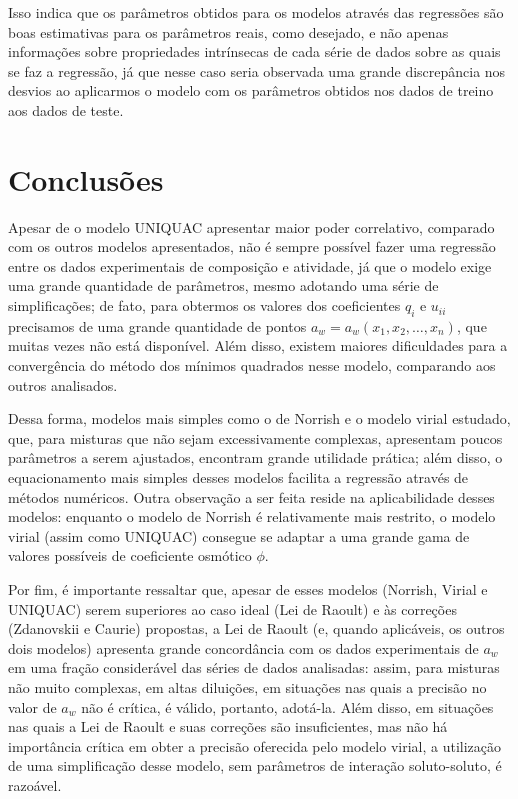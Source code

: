 \documentclass[
	12pt,				%
	openright,
	twoside,
	a4paper,			%
	english,			%
	french,				%
	spanish,			%
	brazil				%
	]{abntex2}
\begin{document}
Isso indica que os parâmetros obtidos para os modelos através das regressões são
boas estimativas para os parâmetros reais, como desejado, e não apenas informações
sobre propriedades intrínsecas de cada série de dados sobre as quais se faz a
regressão, já que nesse caso seria observada uma grande discrepância nos desvios
ao aplicarmos o modelo com os parâmetros obtidos nos dados de treino aos dados de
teste.


\part{Conclusões}

Apesar de o modelo UNIQUAC apresentar maior poder correlativo, comparado com os
outros modelos apresentados, não é sempre possível fazer uma regressão entre os
dados experimentais de composição e atividade, já que o modelo exige uma grande
quantidade de parâmetros, mesmo adotando uma série de simplificações; de fato,
para obtermos os valores dos coeficientes $q_i$ e $u_{ii}$ precisamos de uma grande
quantidade de pontos $a_w=a_w(x_1,x_2,\ldots,x_n)$, que muitas vezes não está
disponível. Além disso, existem maiores dificuldades para a convergência do método
dos mínimos quadrados nesse modelo, comparando aos outros analisados.

Dessa forma, modelos mais simples como o de Norrish e o modelo virial estudado, que,
para misturas que não sejam excessivamente complexas, apresentam poucos parâmetros
a serem ajustados, encontram grande utilidade prática; além disso, o equacionamento
mais simples desses modelos facilita a regressão através de métodos numéricos. Outra
observação a ser feita reside na aplicabilidade desses modelos: enquanto o modelo
de Norrish é relativamente mais restrito, o modelo virial (assim como UNIQUAC)
consegue se adaptar a uma grande gama de valores possíveis de coeficiente osmótico
$\phi$.

Por fim, é importante ressaltar que, apesar de esses modelos (Norrish, Virial e
UNIQUAC) serem superiores ao caso ideal (Lei de Raoult) e às correções (Zdanovskii
e Caurie) propostas, a Lei de Raoult (e, quando aplicáveis, os outros dois modelos)
apresenta grande concordância com os dados experimentais de $a_w$ em uma fração
considerável das séries de dados analisadas: assim, para misturas não muito
complexas, em altas diluições, em situações nas quais a precisão no valor
de $a_w$ não é crítica, é válido, portanto, adotá-la. Além disso, em situações
nas quais a Lei de Raoult e suas correções são insuficientes, mas não há
importância crítica em obter a precisão oferecida pelo modelo virial, a utilização
de uma simplificação desse modelo, sem parâmetros de interação soluto-soluto, é
razoável.
\end{document}
